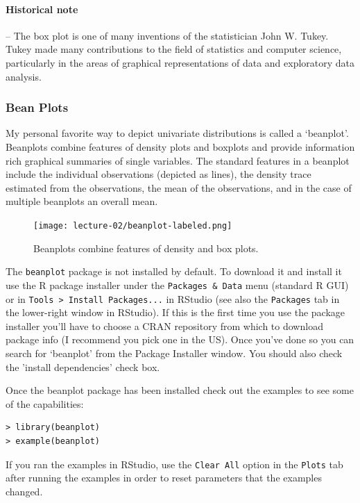 \documentclass{article}
\begin{document}
\paragraph{Historical note}

-- The box plot is one of many inventions of the statistician John W.
Tukey. Tukey made many contributions to the field of statistics and
computer science, particularly in the areas of graphical representations
of data and exploratory data analysis.

\subsubsection{Bean Plots}

My personal favorite way to depict univariate distributions is called a
`beanplot'. Beanplots combine features of density plots and boxplots and
provide information rich graphical summaries of single variables. The
standard features in a beanplot include the individual observations
(depicted as lines), the density trace estimated from the observations,
the mean of the observations, and in the case of multiple beanplots an
overall mean.

\begin{figure}[htbp]
\centering
\texttt{[image: lecture-02/beanplot-labeled.png]}
\caption{Beanplots combine features of density and box plots.}
\end{figure}

The \lstinline!beanplot! package is not installed by default. To
download it and install it use the R package installer under the
\lstinline!Packages & Data! menu (standard R GUI) or in
\lstinline!Tools > Install Packages...! in RStudio (see also the
\lstinline!Packages! tab in the lower-right window in RStudio). If this
is the first time you use the package installer you'll have to choose a
CRAN repository from which to download package info (I recommend you
pick one in the US). Once you've done so you can search for `beanplot'
from the Package Installer window. You should also check the 'install
dependencies' check box.

Once the beanplot package has been installed check out the examples to
see some of the capabilities:

\begin{lstlisting}
> library(beanplot) 
> example(beanplot)    
\end{lstlisting}
If you ran the examples in RStudio, use the \lstinline!Clear All! option
in the \lstinline!Plots! tab after running the examples in order to
reset parameters that the examples changed.
\end{document}
